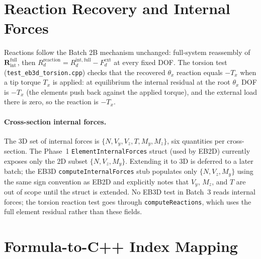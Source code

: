 \documentclass[11pt,a4paper]{article}
\newcommand{\bmath}[1]{\boldsymbol{#1}}
\begin{document}
\section{Reaction Recovery and Internal Forces}

Reactions follow the Batch 2B mechanism unchanged: full-system reassembly of $\bmath{R}_{\mathrm{int}}^{\text{full}}$, then $R_d^{\mathrm{reaction}} = R_d^{\mathrm{int,full}} - F_d^{\mathrm{ext}}$ at every fixed DOF. The torsion test (\texttt{test\_eb3d\_torsion.cpp}) checks that the recovered $\theta_x$ reaction equals $-T_x$ when a tip torque $T_x$ is applied: at equilibrium the internal residual at the root $\theta_x$ DOF is $-T_x$ (the elements push back against the applied torque), and the external load there is zero, so the reaction is $-T_x$.

\paragraph{Cross-section internal forces.} The 3D set of internal forces is $\{N, V_y, V_z, T, M_y, M_z\}$, six quantities per cross-section. The Phase~1 \texttt{ElementInternalForces} struct (used by EB2D) currently exposes only the 2D subset $\{N, V_z, M_y\}$. Extending it to 3D is deferred to a later batch; the EB3D \texttt{computeInternalForces} stub populates only $\{N, V_z, M_y\}$ using the same sign convention as EB2D and explicitly notes that $V_y$, $M_z$, and $T$ are out of scope until the struct is extended. No EB3D test in Batch~3 reads internal forces; the torsion reaction test goes through \texttt{computeReactions}, which uses the full element residual rather than these fields.

\section{Formula-to-C++ Index Mapping}
\end{document}
